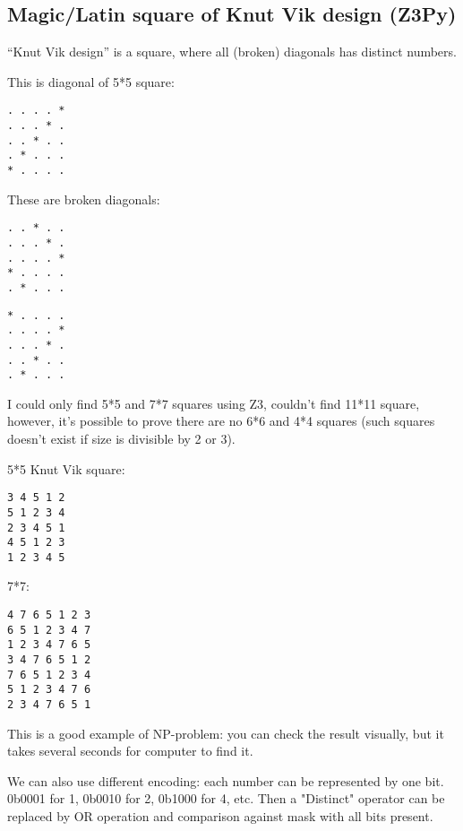 \subsection{Magic/Latin square of Knut Vik design (Z3Py)}

``Knut Vik design'' is a square, where all (broken) diagonals has distinct numbers.

This is diagonal of 5*5 square:

\begin{lstlisting}
. . . . *
. . . * .
. . * . .
. * . . .
* . . . .
\end{lstlisting}

These are broken diagonals:

\begin{lstlisting}
. . * . .
. . . * .
. . . . *
* . . . .
. * . . .
\end{lstlisting}

\begin{lstlisting}
* . . . .
. . . . *
. . . * .
. . * . .
. * . . .
\end{lstlisting}

I could only find 5*5 and 7*7 squares using Z3, couldn't find 11*11 square, however, it's possible to prove there are no 6*6 and 4*4 squares (such squares doesn't exist if size is divisible by 2 or 3).



5*5 Knut Vik square:

\begin{lstlisting}
3 4 5 1 2
5 1 2 3 4
2 3 4 5 1
4 5 1 2 3
1 2 3 4 5
\end{lstlisting}

7*7:

\begin{lstlisting}
4 7 6 5 1 2 3
6 5 1 2 3 4 7
1 2 3 4 7 6 5
3 4 7 6 5 1 2
7 6 5 1 2 3 4
5 1 2 3 4 7 6
2 3 4 7 6 5 1
\end{lstlisting}

This is a good example of NP-problem: you can check the result visually, but it takes several seconds for computer to find it.

We can also use different encoding: each number can be represented by one bit. 0b0001 for 1, 0b0010 for 2, 0b1000 for 4, etc.
Then a "Distinct" operator can be replaced by OR operation and comparison against mask with all bits present.



